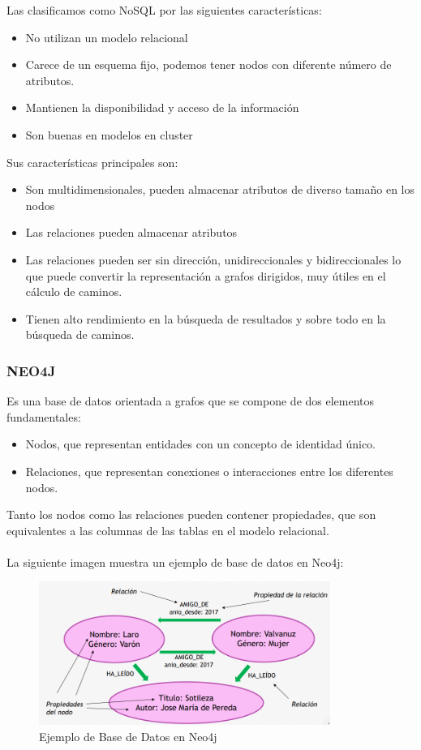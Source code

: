 \documentclass[preprint,12pt]{elsarticle}
\begin{document}
Las clasificamos como NoSQL por las siguientes características:
\begin{itemize}
     \item No utilizan un modelo relacional 
     \item Carece de un esquema fijo, podemos tener nodos con diferente número de atributos.  
     \item Mantienen la disponibilidad y acceso de la información
     \item Son buenas en modelos en cluster
\end{itemize}

Sus características principales son:
\begin{itemize}
 \item Son multidimensionales, pueden almacenar atributos de diverso tamaño en los nodos
 \item Las relaciones pueden almacenar atributos
 \item Las relaciones pueden ser sin dirección, unidireccionales y bidireccionales lo que puede convertir la representación a grafos dirigidos, muy útiles en el cálculo de caminos.
 \item Tienen alto rendimiento en la búsqueda de resultados y sobre todo en la búsqueda de caminos.
\end{itemize}


\subsubsection{\textbf{NEO4J}}
Es una base de datos orientada a grafos que se compone de dos elementos fundamentales:
\begin{itemize}
 \item Nodos, que representan entidades con un concepto de identidad único. 
 \item Relaciones, que representan conexiones o interacciones entre los diferentes nodos.
\end{itemize}
Tanto los nodos como las relaciones pueden contener propiedades, que son equivalentes a las columnas de las tablas en el modelo relacional. 
\\ \\ La siguiente imagen muestra un ejemplo de base de datos en Neo4j:

\begin{figure}[htb]
	\begin{center}
		\includegraphics[width=9.5cm]{./IMAGENES/ejemplo_neo4j} 
		\caption{Ejemplo de Base de Datos en Neo4j}
	\end{center}
\end{figure}
\end{document}
